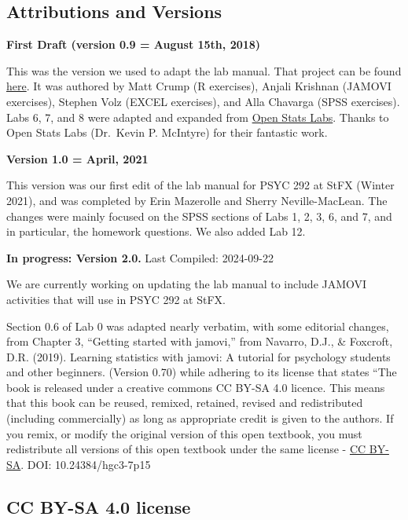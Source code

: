 \documentclass[
]{book}
\begin{document}
\hypertarget{attributions-and-versions}{%
\subsection{Attributions and Versions}\label{attributions-and-versions}}

\textbf{First Draft (version 0.9 = August 15th, 2018)}

This was the version we used to adapt the lab manual. That project can be found \href{https://crumplab.github.io/statisticsLab/}{here}. It was authored by Matt Crump (R exercises), Anjali Krishnan (JAMOVI exercises), Stephen Volz (EXCEL exercises), and Alla Chavarga (SPSS exercises). Labs 6, 7, and 8 were adapted and expanded from \href{https://sites.trinity.edu/osl}{Open Stats Labs}. Thanks to Open Stats Labs (Dr.~Kevin P. McIntyre) for their fantastic work.

\textbf{Version 1.0 = April, 2021}

This version was our first edit of the lab manual for PSYC 292 at StFX (Winter 2021), and was completed by Erin Mazerolle and Sherry Neville-MacLean. The changes were mainly focused on the SPSS sections of Labs 1, 2, 3, 6, and 7, and in particular, the homework questions. We also added Lab 12.

\textbf{In progress: Version 2.0.} Last Compiled: 2024-09-22

We are currently working on updating the lab manual to include JAMOVI activities that will use in PSYC 292 at StFX.

Section 0.6 of Lab 0 was adapted nearly verbatim, with some editorial changes, from Chapter 3, ``Getting started with jamovi,'' from Navarro, D.J., \& Foxcroft, D.R. (2019). Learning statistics with jamovi: A tutorial for psychology students and other beginners. (Version 0.70) while adhering to its license that states ``The book is released under a creative commons CC BY-SA 4.0 licence. This means that this book can be reused, remixed, retained, revised and redistributed (including commercially) as long as appropriate credit is given to the authors. If you remix, or modify the original version of this open textbook, you must redistribute all versions of this open textbook under the same license - \href{https://creativecommons.org/licenses/by-sa/4.0/deed.ast}{CC BY-SA}. DOI: 10.24384/hgc3-7p15

\hypertarget{cc-by-sa-4.0-license}{%
\subsection{CC BY-SA 4.0 license}\label{cc-by-sa-4.0-license}}
\end{document}
